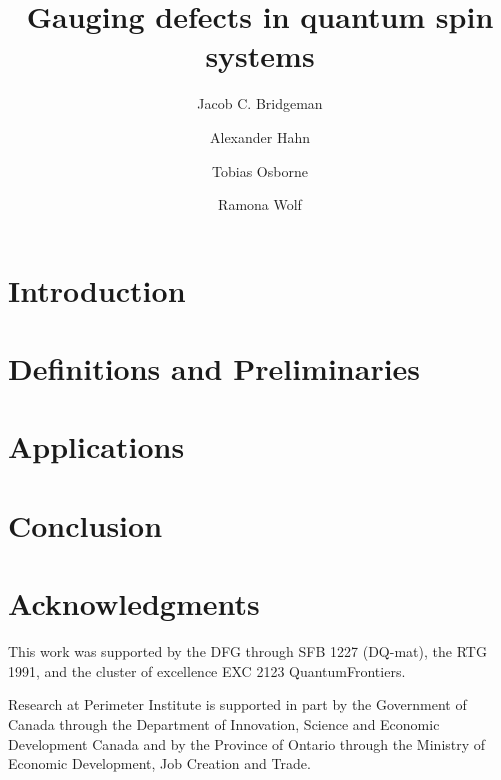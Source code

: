 

\title{Gauging defects in quantum spin systems}
\author{Jacob C. Bridgeman}
\author{Alexander Hahn}
\author{Tobias Osborne}
\author{Ramona Wolf}

\newcommand{\jcb}[1]{\textcolor{blue}{#1}}



\maketitle

\begin{abstract}
	
\end{abstract}

\section{Introduction}


\section{Definitions and Preliminaries}






\section{Applications}



\section{Conclusion}

\section*{Acknowledgments}
This work was supported by the DFG through SFB 1227 (DQ-mat), the RTG 1991, and the cluster of excellence EXC 2123 QuantumFrontiers.

Research at Perimeter Institute is supported in part by the Government of Canada through the Department of Innovation, Science and Economic Development Canada and by the Province of Ontario through the Ministry of Economic Development, Job Creation and Trade.



